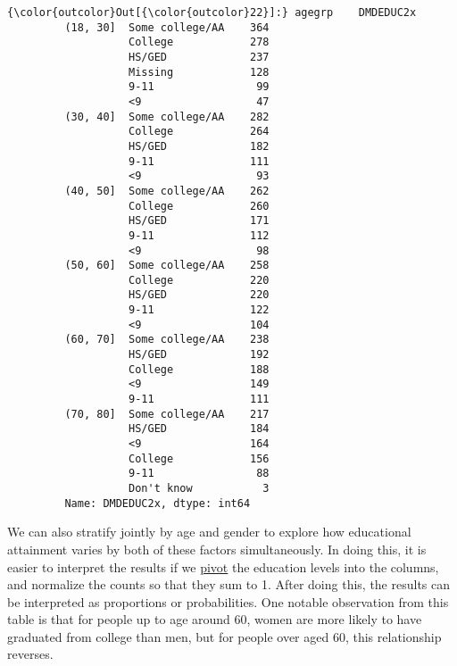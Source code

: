 \documentclass[11pt]{article}
\begin{document}
\begin{Verbatim}[commandchars=\\\{\}]
{\color{outcolor}Out[{\color{outcolor}22}]:} agegrp    DMDEDUC2x      
         (18, 30]  Some college/AA    364
                   College            278
                   HS/GED             237
                   Missing            128
                   9-11                99
                   <9                  47
         (30, 40]  Some college/AA    282
                   College            264
                   HS/GED             182
                   9-11               111
                   <9                  93
         (40, 50]  Some college/AA    262
                   College            260
                   HS/GED             171
                   9-11               112
                   <9                  98
         (50, 60]  Some college/AA    258
                   College            220
                   HS/GED             220
                   9-11               122
                   <9                 104
         (60, 70]  Some college/AA    238
                   HS/GED             192
                   College            188
                   <9                 149
                   9-11               111
         (70, 80]  Some college/AA    217
                   HS/GED             184
                   <9                 164
                   College            156
                   9-11                88
                   Don't know           3
         Name: DMDEDUC2x, dtype: int64
\end{Verbatim}
            
    We can also stratify jointly by age and gender to explore how
educational attainment varies by both of these factors simultaneously.
In doing this, it is easier to interpret the results if we
\href{https://pandas.pydata.org/pandas-docs/stable/reshaping.html\#reshaping-by-stacking-and-unstacking}{pivot}
the education levels into the columns, and normalize the counts so that
they sum to 1. After doing this, the results can be interpreted as
proportions or probabilities. One notable observation from this table is
that for people up to age around 60, women are more likely to have
graduated from college than men, but for people over aged 60, this
relationship reverses.
\end{document}
